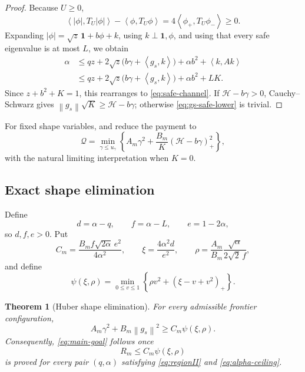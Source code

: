 \documentclass[11pt]{article}
\newtheorem{theorem}{Theorem}[section]
\newcommand{\one}{\mathbf 1}
\newcommand{\ip}[2]{\left\langle #1,#2\right\rangle}
\newcommand{\norm}[1]{\left\lVert #1\right\rVert}
\newcommand{\pos}[1]{\left(#1\right)_{+}}
\newcommand{\cH}{\mathcal H}
\newcommand{\cQ}{\mathcal Q}
\begin{document}
\begin{proof}
Because \(U\ge0\),
\[
 \ip{|\phi|}{T_U|\phi|}-\ip\phi{T_U\phi}
 =4\ip{\phi_+}{T_U\phi_-}\ge0.
\]
Expanding \(|\phi|=\sqrt z\,\one+b\phi+k\), using
\(k\perp\one,\phi\), and using that every safe eigenvalue is at most \(L\),
we obtain
\[
\begin{aligned}
 \alpha
 &\le qz+2\sqrt z\bigl(b\gamma+\ip{g_s}{k}\bigr)
       +\alpha b^2+\ip k{Ak}\\
 &\le qz+2\sqrt z\bigl(b\gamma+\ip{g_s}{k}\bigr)
       +\alpha b^2+LK.
\end{aligned}
\]
Since \(z+b^2+K=1\), this rearranges to
\eqref{eq:safe-channel}.  If \(\cH-b\gamma>0\), Cauchy--Schwarz gives
\(\norm{g_s}\sqrt K\ge\cH-b\gamma\); otherwise
\eqref{eq:gs-safe-lower} is trivial.
\end{proof}

For fixed shape variables,  and
 reduce the payment to
\begin{equation}\label{eq:Q-shape}
 \cQ=
 \min_{\gamma\le u_\gamma}
 \left\{
 A_m\gamma^2+\frac{B_m}{K}\pos{\cH-b\gamma}^2
 \right\},
\end{equation}
with the natural limiting interpretation when \(K=0\).

\subsection{Exact shape elimination}\label{subsec:shape-elim}

Define
\begin{equation}\label{eq:dfe}
       d=\alpha-q,
       \qquad f=\alpha-L,
       \qquad e=1-2\alpha,
\end{equation}
so \(d,f,e>0\).  Put
\begin{equation}\label{eq:C-xi-rho}
 C_m=\frac{B_mf\sqrt{2\alpha}\,e^2}{4\alpha^2},
 \qquad
 \xi=\frac{4\alpha^2d}{e^2},
 \qquad
 \rho=\frac{A_m}{B_m}\frac{\sqrt\alpha}{2\sqrt2\,f},
\end{equation}
and define
\begin{equation}\label{eq:psi-def}
       \psi(\xi,\rho)=
       \min_{0\le v\le1}
       \left\{\rho v^2+\pos{\xi-v+v^2}\right\}.
\end{equation}

\begin{theorem}[Huber shape elimination]\label{thm:huber-elim}
For every admissible frontier configuration,
\begin{equation}\label{eq:huber-payment}
       A_m\gamma^2+B_m\norm{g_s}^2
       \ge C_m\psi(\xi,\rho).
\end{equation}
Consequently, \eqref{eq:main-goal} follows once
\begin{equation}\label{eq:scalar-target}
       R_m\le C_m\psi(\xi,\rho)
\end{equation}
is proved for every pair \((q,\alpha)\) satisfying
\eqref{eq:regionII} and \eqref{eq:alpha-ceiling}.
\end{theorem}
\end{document}
